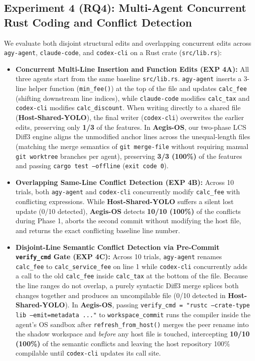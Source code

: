 \documentclass[acmsmall,screen,review]{acmart}
\begin{document}
\subsection{Experiment 4 (RQ4): Multi-Agent Concurrent Rust Coding and Conflict Detection}

We evaluate both disjoint structural edits and overlapping concurrent edits across \texttt{agy-agent}, \texttt{claude-code}, and \texttt{codex-cli} on a Rust crate (\texttt{src/lib.rs}):
\begin{itemize}
    \item \textbf{Concurrent Multi-Line Insertion and Function Edits (EXP 4A):} All three agents start from the same baseline \texttt{src/lib.rs}. \texttt{agy-agent} inserts a 3-line helper function (\texttt{min\_fee()}) at the top of the file and updates \texttt{calc\_fee} (shifting downstream line indices), while \texttt{claude-code} modifies \texttt{calc\_tax} and \texttt{codex-cli} modifies \texttt{calc\_discount}. When writing directly to a shared file (\textbf{Host-Shared-YOLO}), the final writer (\texttt{codex-cli}) overwrites the earlier edits, preserving only \textbf{1/3} of the features. In \textbf{Aegis-OS}, our two-phase LCS Diff3 engine aligns the unmodified anchor lines across the unequal-length files (matching the merge semantics of \texttt{git merge-file} without requiring manual \texttt{git worktree} branches per agent), preserving \textbf{3/3 (100\%)} of the features and passing \texttt{cargo test --offline} (\texttt{exit code 0}).
    \item \textbf{Overlapping Same-Line Conflict Detection (EXP 4B):} Across 10 trials, both \texttt{agy-agent} and \texttt{codex-cli} concurrently modify \texttt{calc\_fee} with conflicting expressions. While \textbf{Host-Shared-YOLO} suffers a silent lost update (0/10 detected), \textbf{Aegis-OS} detects \textbf{10/10 (100\%)} of the conflicts during Phase 1, aborts the second commit without modifying the host file, and returns the exact conflicting baseline line number.
    \item \textbf{Disjoint-Line Semantic Conflict Detection via Pre-Commit \texttt{verify\_cmd} Gate (EXP 4C):} Across 10 trials, \texttt{agy-agent} renames \texttt{calc\_fee} to \texttt{calc\_service\_fee} on line 1 while \texttt{codex-cli} concurrently adds a call to the old \texttt{calc\_fee} inside \texttt{calc\_tax} at the bottom of the file. Because the line ranges do not overlap, a purely syntactic Diff3 merge splices both changes together and produces an uncompilable file (0/10 detected in \textbf{Host-Shared-YOLO}). In \textbf{Aegis-OS}, passing \texttt{verify\_cmd = "rustc --crate-type lib --emit=metadata ..."} to \texttt{workspace\_commit} runs the compiler inside the agent's OS sandbox after \texttt{refresh\_from\_host()} merges the peer rename into the shadow workspace and \emph{before} any host file is touched, intercepting \textbf{10/10 (100\%)} of the semantic conflicts and leaving the host repository 100\% compilable until \texttt{codex-cli} updates its call site.

\end{itemize}
\end{document}
